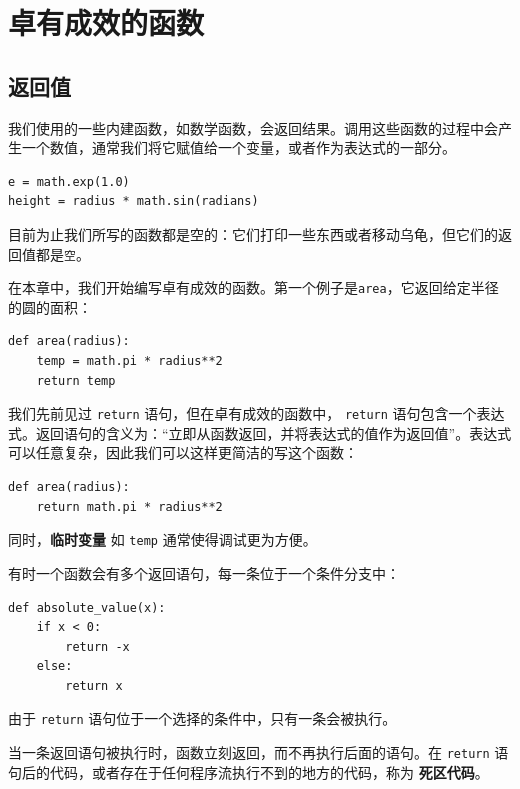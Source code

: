 \chapter{卓有成效的函数}
\label{fruitchap}

\section{返回值}

我们使用的一些内建函数，如数学函数，会返回结果。调用这些函数的过程中会产生一个数值，通常我们将它赋值给一个变量，或者作为表达式的一部分。

\beforeverb
\begin{verbatim}
e = math.exp(1.0)
height = radius * math.sin(radians)
\end{verbatim}
\afterverb
%
目前为止我们所写的函数都是空的：它们打印一些东西或者移动乌龟，但它们的返回值都是{\tt 空}。

在本章中，我们开始编写卓有成效的函数。第一个例子是{\tt area}，它返回给定半径的圆的面积：

\beforeverb
\begin{verbatim}
def area(radius):
    temp = math.pi * radius**2
    return temp
\end{verbatim}
\afterverb
%
我们先前见过  {\tt return} 语句，但在卓有成效的函数中， {\tt return} 语句包含一个表达式。返回语句的含义为：“立即从函数返回，并将表达式的值作为返回值”。表达式可以任意复杂，因此我们可以这样更简洁的写这个函数：


\beforeverb
\begin{verbatim}
def area(radius):
    return math.pi * radius**2
\end{verbatim}
\afterverb
%
同时，{\bf 临时变量} 如 {\tt temp} 通常使得调试更为方便。


有时一个函数会有多个返回语句，每一条位于一个条件分支中：

\beforeverb
\begin{verbatim}
def absolute_value(x):
    if x < 0:
        return -x
    else:
        return x
\end{verbatim}
\afterverb
%
由于 {\tt return} 语句位于一个选择的条件中，只有一条会被执行。

当一条返回语句被执行时，函数立刻返回，而不再执行后面的语句。在 {\tt return} 语句后的代码，或者存在于任何程序流执行不到的地方的代码，称为 {\bf 死区代码}。

